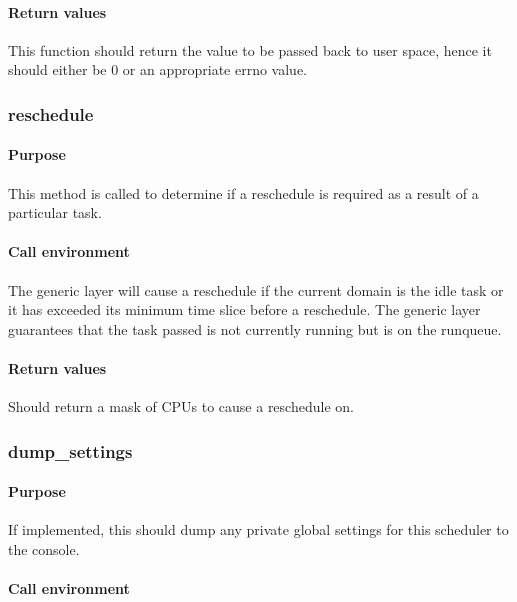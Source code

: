 \documentclass[11pt,twoside,final,openright]{xenstyle}
\begin{document}
\paragraph*{Return values}

This function should return the value to be passed back to user space, hence it
should either be 0 or an appropriate errno value.

\subsubsection{reschedule}

\paragraph*{Purpose}

This method is called to determine if a reschedule is required as a result of a
particular task.

\paragraph*{Call environment}
The generic layer will cause a reschedule if the current domain is the idle
task or it has exceeded its minimum time slice before a reschedule.  The
generic layer guarantees that the task passed is not currently running but is
on the runqueue.

\paragraph*{Return values}

Should return a mask of CPUs to cause a reschedule on.

\subsubsection{dump\_settings}

\paragraph*{Purpose}

If implemented, this should dump any private global settings for this
scheduler to the console.

\paragraph*{Call environment}
\end{document}
